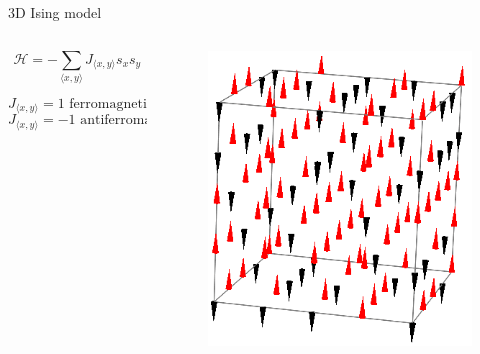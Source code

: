 \documentclass[12pt,handout]{beamer}
\begin{document}
\begin{frame}{3D Ising model}
\begin{center}
\begin{columns}
\begin{column}{0.43\textwidth}
 \[
\mathcal{H} = -\sum_{\langle x, y \rangle} J_{\langle x, y \rangle} s_x s_y
\]

\[
J_{\langle x, y \rangle} = 1\text{ ferromagnetic}
\]
\[
J_{\langle x, y \rangle} = -1\text{ antiferromagnetic}
\]
\end{column}

\begin{column}{0.57\textwidth}  %
 \begin{figure}[!htb]
\centering
\includegraphics[scale=0.5]{ising.png}
\end{figure}
\end{column}
\end{columns}


\end{center}
\end{frame}
\end{document}
